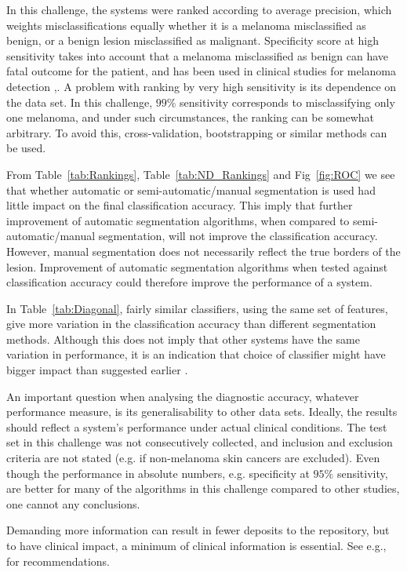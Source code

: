 \documentclass[10pt,letterpaper]{article}
\begin{document}
In this challenge, the systems were ranked according to average precision, which weights misclassifications equally whether it is a melanoma misclassified as benign, or a benign lesion misclassified as malignant. 
Specificity score at high sensitivity takes into account that a melanoma misclassified as benign can have fatal outcome for the patient, and has been used in clinical studies for melanoma detection \cite{Malvehy2014Clinical},\cite{Monheit2011Performance}.
A problem with ranking by very high sensitivity is its dependence on the data set. 
In this challenge, $99\%$ sensitivity corresponds to misclassifying only one melanoma, and under such circumstances, the ranking can be somewhat arbitrary. 
To avoid this, cross-validation, bootstrapping or similar methods can be used.   

From Table~\ref{tab:Rankings}, Table~\ref{tab:ND_Rankings} and Fig~\ref{fig:ROC} we see that whether automatic or semi-automatic/manual segmentation is used had little impact on the final classification accuracy.
This imply that further improvement of automatic segmentation algorithms, when compared to semi-automatic/manual segmentation,  will not improve the classification accuracy.
However, manual segmentation does not necessarily reflect the true borders of the lesion.
Improvement of automatic segmentation algorithms when tested against classification accuracy could therefore improve the performance of a system. 

In Table~\ref{tab:Diagonal}, fairly similar classifiers, using the same set of features, give more variation in the classification accuracy than different segmentation methods. 
Although this does not imply that other systems have the same variation in performance, it is an indication that choice of classifier might have bigger impact than suggested earlier \cite{Maglogiannis2009Overview}. 

An important question when analysing the diagnostic accuracy, whatever performance measure, is its generalisability to other data sets. 
Ideally, the results should reflect a system's performance under actual clinical conditions. 
The test set in this challenge was not consecutively collected, and inclusion and exclusion criteria are not stated (e.g. if non-melanoma skin cancers are excluded). Even though the performance in absolute numbers, e.g. specificity at $95\%$ sensitivity, are better for many of the algorithms in this challenge compared to other studies, one cannot any conclusions. 

Demanding more information can result in fewer deposits to the repository, but to have clinical impact, a minimum of clinical information is essential. 
See e.g., \cite{Malvehy2007Dermoscopy} for recommendations. 
\end{document}
